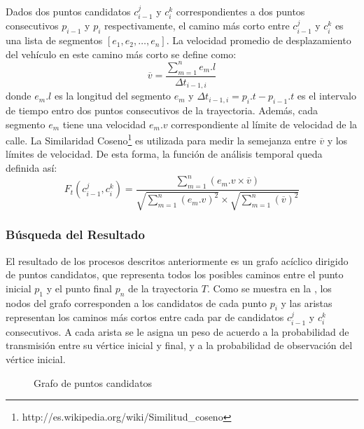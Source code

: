 Dados dos puntos candidatos $c_{i-1}^{j}$ y $c_{i}^{k}$ correspondientes a dos puntos consecutivos $p_{i-1}$ y $p_i$ respectivamente, el camino más corto entre $c_{i-1}^{j}$ y $c_{i}^{k}$ es una lista de segmentos $[e_1, e_2, \dots, e_n]$. La velocidad promedio de desplazamiento del vehículo en este camino más corto se define como:
\begin{equation}
\overline{v} = \frac { \sum_{m=1}^{n} {e_m.l} }{ \Delta t_{i-1, i} }
\end{equation}
donde $e_m.l$ es la longitud del segmento $e_m$ y $\Delta t_{i-1, i} = p_i.t - p_{i-1}.t$ es el intervalo de tiempo entro dos puntos consecutivos de la trayectoria. Además, cada segmento $e_m$ tiene una velocidad $e_m.v$ correspondiente al límite de velocidad de la calle. La Similaridad Coseno\footnote{http://es.wikipedia.org/wiki/Similitud\_coseno} es utilizada para medir la semejanza entre $\overline{v}$ y los límites de velocidad. De esta forma, la función de análisis temporal queda definida así:
\begin{equation} \label{funcion_temporal}
F_{ t }(c_{ i-1 }^{ j },c_{ i }^{ k })=\frac { \sum _{ m=1 }^{ n }{ (e_{ m }.v\times \overline { v } ) }  }{ \sqrt { \sum _{ m=1 }^{ n }{ (e_{ m }.v)^{ 2 } }  } \times \sqrt { \sum _{ m=1 }^{ n }{ (\overline { v } )^{ 2 } }  }  } 
\end{equation}

\subsubsection{Búsqueda del Resultado}

\label{busqueda_de_resultado}
El resultado de los procesos descritos anteriormente es un grafo acíclico dirigido de puntos candidatos, que representa todos los posibles caminos entre el punto inicial $p_1$ y el punto final $p_n$ de la trayectoria $T$. Como se muestra en la , los nodos del grafo corresponden a los candidatos de cada punto $p_i$ y las aristas representan los caminos más cortos entre cada par de candidatos $c_{i-1}^j$ y $c_i^k$ consecutivos. A cada arista se le asigna un peso de acuerdo a la probabilidad de transmisión entre su vértice inicial y final, y a la probabilidad de observación del vértice inicial.

\begin{figure}[h*]
	\centering
	
	\caption{\label{fig:grafo_de_candidatos} Grafo de puntos candidatos}	
\end{figure}

